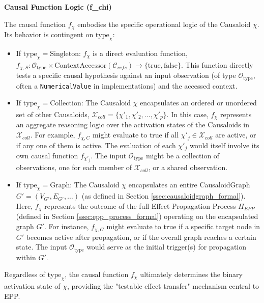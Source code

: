 \textbf{Causal Function Logic (f\_chi)}
    
    
    The causal function \(f_\chi\) embodies the specific operational logic of the Causaloid \(\chi\). Its behavior is contingent on \(\text{type}_\chi\):

    \begin{itemize}
        \item If \( \text{type}_\chi = \text{Singleton} \):
            \(f_\chi\) is a direct evaluation function, \(f_{\chi,S}: \mathcal{O}_{\text{type}} \times \text{ContextAccessor}(\mathcal{C}_{refs}) \to \{\text{true}, \text{false}\}\). This function directly tests a specific causal hypothesis against an input observation (of type \(\mathcal{O}_{\text{type}}\), often a \texttt{NumericalValue} in implementations) and the accessed context. 

        \item If \( \text{type}_\chi = \text{Collection} \):
            The Causaloid \(\chi\) encapsulates an ordered or unordered set of other Causaloids, \(\mathcal{X}_{coll} = \{\chi'_1, \chi'_2, \dots, \chi'_p\}\). 
            In this case, \(f_\chi\) represents an aggregate reasoning logic over the activation states of the Causaloids in \(\mathcal{X}_{coll}\). For example, \(f_{\chi,C}\) might evaluate to true if all \(\chi'_j \in \mathcal{X}_{coll}\) are active, or if any one of them is active. The evaluation of each \(\chi'_j\) would itself involve its own causal function \(f_{\chi'_j}\). The input \(\mathcal{O}_{\text{type}}\) might be a collection of observations, one for each member of \(\mathcal{X}_{coll}\), or a shared observation.

        \item If \( \text{type}_\chi = \text{Graph} \):
            The Causaloid \(\chi\) encapsulates an entire CausaloidGraph \(G'=(V_{G'}, E_{G'}, \dots)\) (as defined in Section \ref{ssec:causaloidgraph_formal}). 
            Here, \(f_\chi\) represents the outcome of the full Effect Propagation Process \(\Pi_{EPP}\) (defined in Section \ref{ssec:epp_process_formal}) operating on the encapsulated graph \(G'\). For instance, \(f_{\chi,G}\) might evaluate to true if a specific target node in \(G'\) becomes active after propagation, or if the overall graph reaches a certain state. The input \(\mathcal{O}_{\text{type}}\) would serve as the initial trigger(s) for propagation within \(G'\).
    \end{itemize}
    Regardless of \(\text{type}_\chi\), the causal function \(f_\chi\) ultimately determines the binary activation state of \(\chi\), providing the "testable effect transfer" mechanism central to EPP.

